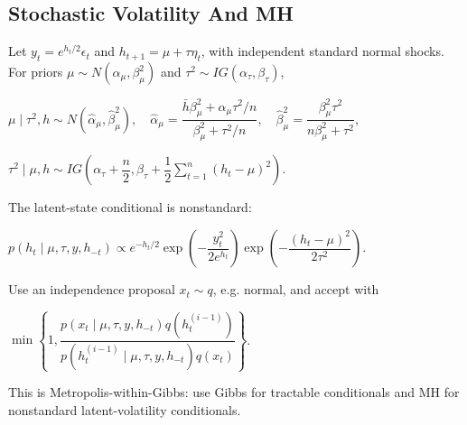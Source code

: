 \subsection{Stochastic Volatility And MH}

Let $y_t=e^{h_t/2}\epsilon_t$ and $h_{t+1}=\mu+\tau\eta_t$, with independent standard normal shocks. For priors $\mu\sim N(\alpha_\mu,\beta_\mu^2)$ and $\tau^2\sim IG(\alpha_\tau,\beta_\tau)$,

$\mu\mid\tau^2,h\sim N(\hat\alpha_\mu,\hat\beta_\mu^2),\quad \hat\alpha_\mu=\dfrac{\bar h\beta_\mu^2+\alpha_\mu\tau^2/n}{\beta_\mu^2+\tau^2/n},\quad \hat\beta_\mu^2=\dfrac{\beta_\mu^2\tau^2}{n\beta_\mu^2+\tau^2}$,

$\tau^2\mid\mu,h\sim IG\left(\alpha_\tau+\dfrac n2,\beta_\tau+\dfrac12\sum_{t=1}^n(h_t-\mu)^2\right)$.

The latent-state conditional is nonstandard:

$p(h_t\mid\mu,\tau,y,h_{-t})\propto e^{-h_t/2}\exp\left(-\dfrac{y_t^2}{2e^{h_t}}\right)\exp\left(-\dfrac{(h_t-\mu)^2}{2\tau^2}\right)$.

Use an independence proposal $x_t\sim q$, e.g. normal, and accept with

$\min\left\{1,\dfrac{p(x_t\mid\mu,\tau,y,h_{-t})q(h_t^{(i-1)})}{p(h_t^{(i-1)}\mid\mu,\tau,y,h_{-t})q(x_t)}\right\}$.

This is Metropolis-within-Gibbs: use Gibbs for tractable conditionals and MH for nonstandard latent-volatility conditionals.
